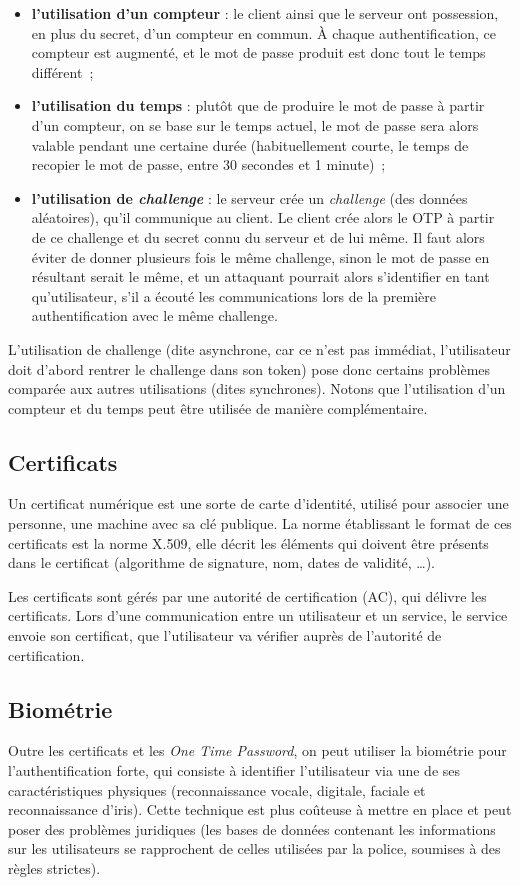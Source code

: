 \begin{itemize}
  \item {\sffamily\textbf{l'utilisation d'un compteur}} : le client ainsi que le
serveur ont possession, en plus du secret, d'un compteur en
commun. À chaque authentification, ce compteur est augmenté, et le
mot de passe produit est donc tout le temps différent~;
  \item {\sffamily\textbf{l'utilisation du temps}} : plutôt que de produire le mot de
passe à partir d'un compteur, on se base sur le temps actuel, le
mot de passe sera alors valable pendant une certaine durée
(habituellement courte, le temps de recopier le mot de passe, 
 entre 30 secondes et 1 minute)~;
  \item {\sffamily\textbf{l'utilisation de \emph{challenge}}} : le serveur crée un
\emph{challenge} (des données aléatoires), qu'il communique au
client. Le client crée alors le OTP à partir de ce challenge et du
secret connu du serveur et de lui même. Il faut alors éviter de
donner plusieurs fois le même challenge, sinon le mot de passe en
résultant serait le même, et un attaquant pourrait alors
s'identifier en tant qu'utilisateur, s'il a écouté les
communications lors de la première authentification avec le même
challenge. 
\\
\end{itemize}

L'utilisation de challenge (dite asynchrone, car ce n'est pas
immédiat, l'utilisateur doit d'abord rentrer le challenge dans 
son token) pose donc certains problèmes comparée aux autres 
utilisations (dites synchrones). Notons que 
l'utilisation d'un compteur et du temps peut être utilisée de
manière complémentaire.


\subsection{Certificats}
Un certificat numérique est une sorte de carte d'identité,
utilisé pour associer une personne, une machine avec sa clé
publique.
La norme établissant le format de ces certificats est la norme
X.509, elle décrit les éléments qui doivent être présents dans le
certificat (algorithme de signature, nom, dates de validité, …).

Les certificats sont gérés par une autorité de certification (AC),
qui délivre les certificats.
Lors d'une communication entre un utilisateur et un service,
le service envoie son certificat, que l'utilisateur va vérifier
auprès de l'autorité de certification.


\subsection{Biométrie}
Outre les certificats et les \emph{One Time Password}, on peut
utiliser la biométrie pour l'authentification forte, qui consiste
à identifier l'utilisateur via une de ses caractéristiques
physiques (reconnaissance vocale, digitale, faciale et
reconnaissance d'iris).
Cette technique est plus coûteuse à mettre en place et peut poser
des problèmes juridiques (les bases de données contenant les
informations sur les utilisateurs se rapprochent de celles
utilisées par la police, soumises à des règles strictes).
